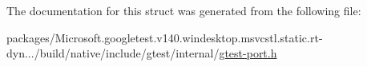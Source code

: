 The documentation for this struct was generated from the following file\+:\begin{DoxyCompactItemize}
\item 
packages/\+Microsoft.\+googletest.\+v140.\+windesktop.\+msvcstl.\+static.\+rt-\/dyn.../build/native/include/gtest/internal/\mbox{\hyperlink{gtest-port_8h}{gtest-\/port.\+h}}\end{DoxyCompactItemize}

